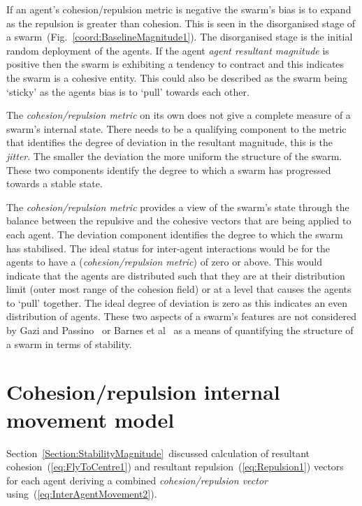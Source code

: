 \documentclass{ieeeaccess}
\begin{document}
If an agent's {cohesion/repulsion metric} is negative the swarm's bias is to expand as the repulsion is greater than cohesion. This is seen in the disorganised stage of a swarm~(Fig.~\ref{coord:BaselineMagnitude1}). The disorganised stage is the initial random deployment of the agents. If the agent \emph{agent resultant magnitude} is positive then the swarm is exhibiting a tendency to contract and this indicates the swarm is a cohesive entity. This could also be described as the swarm being `sticky' as the agents bias is to `pull' towards each other.

The \emph{cohesion/repulsion metric} on its own does not give a complete measure of a swarm's internal state. There needs to be a qualifying component to the metric that identifies the degree of deviation in the resultant magnitude, this is the \emph{jitter}. The smaller the deviation the more uniform the structure of the swarm. These two components identify the degree to which a swarm has progressed towards a stable state.
 
The \emph{cohesion/repulsion metric} provides a view of the swarm's state through the balance between the repulsive and the cohesive vectors that are being applied to each agent. The deviation component identifies the degree to which the swarm has stabilised. The ideal status for inter-agent interactions would be for the agents to have a (\emph{cohesion/repulsion metric}) of zero or above. This would indicate that the agents are distributed such that they are at their distribution limit (outer most range of the cohesion field) or at a level that causes the agents to `pull' together. The ideal degree of deviation is zero as this indicates an even distribution of agents. These two aspects of a swarm's features are not considered by Gazi and Passino~\cite{GP:11} or Barnes et al~\cite{BFV:07} as a means of quantifying the structure of a swarm in terms of stability.

\section{Cohesion/repulsion internal movement model}\label{Section:StabilityModel}
Section~\ref{Section:StabilityMagnitude}~discussed calculation of resultant cohesion~(\ref{eq:FlyToCentre1}) and resultant repulsion~(\ref{eq:Repulsion1}) vectors for each agent deriving a combined \emph{cohesion/repulsion vector} using~(\ref{eq:InterAgentMovement2}). 

\end{document}
